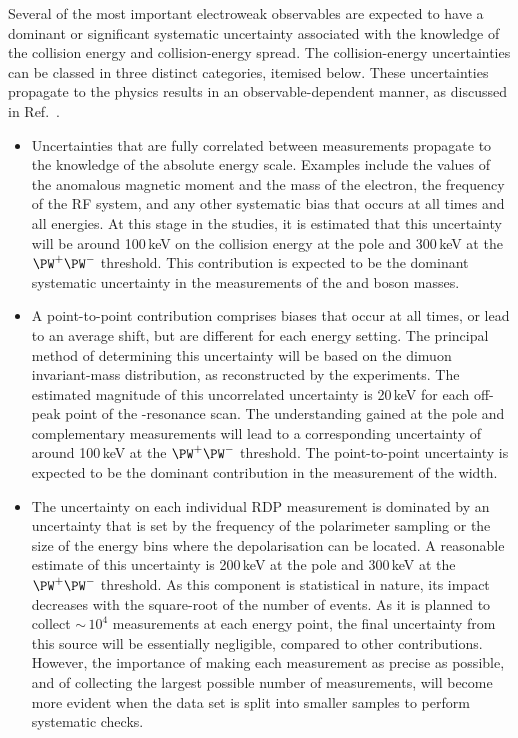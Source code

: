 Several of the most important electroweak observables are expected to have a dominant or significant systematic uncertainty associated with the knowledge of the collision energy and collision-energy spread.   
The collision-energy uncertainties can be classed in three distinct categories, itemised below.  
These uncertainties propagate to the physics results in an observable-dependent manner, as discussed in Ref.~\cite{Blondel:2019jmp}.

\begin{itemize}
    \item  Uncertainties that are fully correlated between measurements propagate to the knowledge of the absolute energy scale.  
    Examples include the values of the anomalous magnetic moment and the mass of the electron, the frequency of the RF system, and any other systematic bias that occurs at all times and all energies.  
    At this stage in the studies, it is estimated that this uncertainty will be around 100\,keV on the collision energy at the \PZ pole and 300\,keV at the $\PW^+\PW^-$ threshold.  
    This contribution is expected to be the dominant systematic uncertainty in the measurements of the \PZ and \PW boson masses.
%
    \item A point-to-point contribution comprises biases that occur at all times, or lead to an average shift, but are different for each energy setting.  
    The principal method of determining this uncertainty will be based on the dimuon invariant-mass distribution, as reconstructed by the experiments.  
    The estimated magnitude of this uncorrelated uncertainty is 20\,keV for each off-peak point of the \mbox{\PZ-resonance} scan.  
    The understanding gained at the \PZ pole and complementary measurements will lead to a corresponding uncertainty of around 100\,keV at the $\PW^+\PW^-$ threshold.  
    The point-to-point uncertainty is expected to be the dominant contribution in the measurement of the \PZ width.
%
   \item The uncertainty on each individual RDP measurement is dominated by an uncertainty that is set by the frequency of the polarimeter sampling or the size of the energy bins where the depolarisation can be located.  
   A reasonable estimate of this uncertainty is 200\,keV at the \PZ pole and 300\,keV  at the $\PW^+\PW^-$ threshold.   
   As this component is statistical in nature, its impact decreases with the square-root of the number of events. 
   As it is planned to collect $\sim$\,$10^4$ measurements at each energy point, the final uncertainty from this source will be essentially negligible, compared to other contributions.  
   However, the importance of making each measurement as precise as possible, and of collecting the largest possible number of measurements, will become more evident when the data set is split into smaller samples to perform systematic checks.
\end{itemize}

